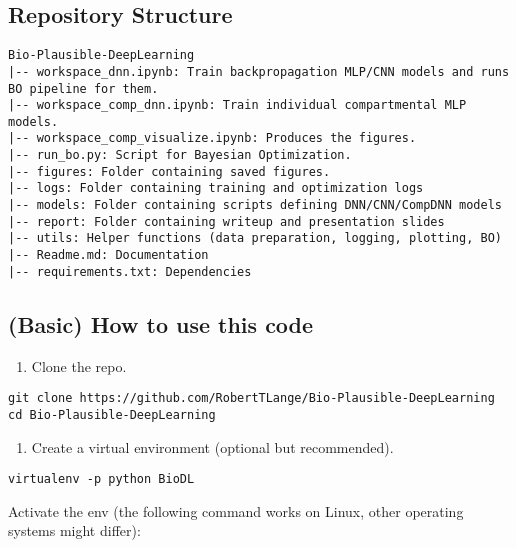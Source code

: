 \hypertarget{repository-structure}{%
\subsection*{Repository Structure}\label{repository-structure}}

\begin{verbatim}
Bio-Plausible-DeepLearning
|-- workspace_dnn.ipynb: Train backpropagation MLP/CNN models and runs BO pipeline for them.
|-- workspace_comp_dnn.ipynb: Train individual compartmental MLP models.
|-- workspace_comp_visualize.ipynb: Produces the figures.
|-- run_bo.py: Script for Bayesian Optimization.
|-- figures: Folder containing saved figures.
|-- logs: Folder containing training and optimization logs
|-- models: Folder containing scripts defining DNN/CNN/CompDNN models
|-- report: Folder containing writeup and presentation slides
|-- utils: Helper functions (data preparation, logging, plotting, BO)
|-- Readme.md: Documentation
|-- requirements.txt: Dependencies
\end{verbatim}

\hypertarget{basic-how-to-use-this-code}{%
\subsection*{(Basic) How to use this
code}\label{basic-how-to-use-this-code}}

\begin{enumerate}
\def\labelenumi{\arabic{enumi}.}
\tightlist
\item
  Clone the repo.
\end{enumerate}

\begin{verbatim}
git clone https://github.com/RobertTLange/Bio-Plausible-DeepLearning
cd Bio-Plausible-DeepLearning
\end{verbatim}

\begin{enumerate}
\def\labelenumi{\arabic{enumi}.}
\setcounter{enumi}{1}
\tightlist
\item
  Create a virtual environment (optional but recommended).
\end{enumerate}

\begin{verbatim}
virtualenv -p python BioDL
\end{verbatim}

Activate the env (the following command works on Linux, other operating
systems might differ):

